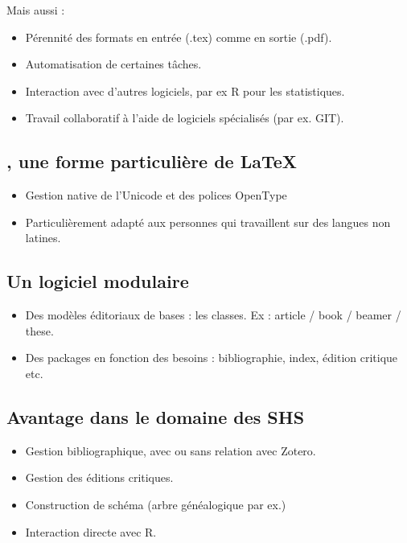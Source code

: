 \begin{slide}
  Mais aussi :
  \begin{itemize}
      \item Pérennité des formats en entrée (.tex) comme en sortie (.pdf).
      \item Automatisation de certaines tâches.
      \item Interaction avec d'autres logiciels, par ex R pour les statistiques.
      \item Travail collaboratif à l'aide de logiciels spécialisés (par ex. GIT).
  \end{itemize}
\end{slide}

\subsection{\XeLaTeX, une forme particulière de \LaTeX}
\begin{slide}
  \begin{itemize}
    \item Gestion native de l'Unicode et des polices OpenType
    \item Particulièrement adapté aux personnes qui travaillent sur des langues non latines.
  \end{itemize}
\end{slide}

\subsection{Un logiciel modulaire}

\begin{slide}
  \begin{itemize}
    \item Des modèles éditoriaux de bases : les classes. Ex : article / book / beamer / these.
    \item Des packages en fonction des besoins : bibliographie, index, édition critique etc. 
  \end{itemize}
\end{slide}
\subsection{Avantage dans le domaine des SHS}

\begin{slide}
  \begin{itemize}
    \item Gestion bibliographique, avec ou sans relation avec Zotero. 
    \item Gestion des éditions critiques.
    \item Construction de schéma (arbre généalogique par ex.)
    \item Interaction directe avec R.
  \end{itemize}
\end{slide}

